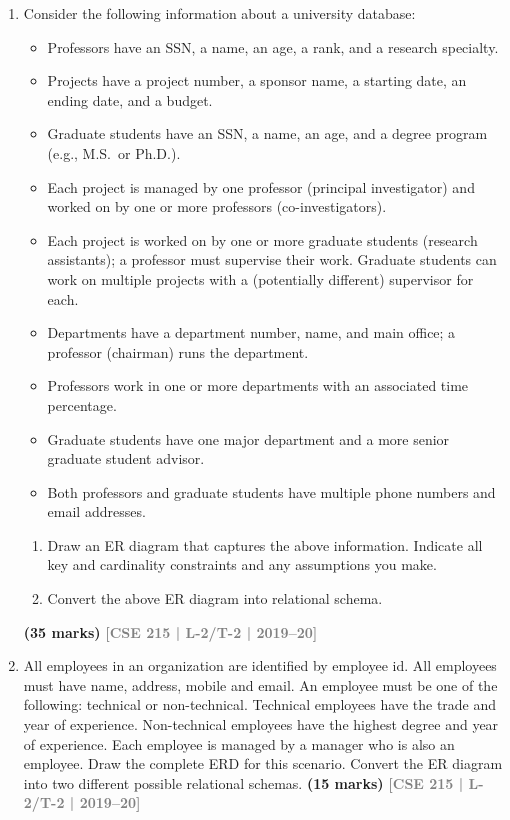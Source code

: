 \documentclass[12pt,a3paper]{article}
\newcommand{\yr}[1]{\hfill\textcolor{gray}{\small\textbf{[#1]}}}
\newcommand{\mk}[1]{\textcolor{orange!70!black}{\small\textbf{(#1 marks)}}}
\begin{document}
\begin{enumerate}
\begin{center}
\end{center}
\mk{10} \yr{CSE 215 | L-2/T-2 | 2018--19}

\item Consider the following information about a university database:
\begin{itemize}[leftmargin=1.5em,itemsep=1pt]
  \item Professors have an SSN, a name, an age, a rank, and a research specialty.
  \item Projects have a project number, a sponsor name, a starting date, an ending date, and a budget.
  \item Graduate students have an SSN, a name, an age, and a degree program (e.g., M.S.\ or Ph.D.).
  \item Each project is managed by one professor (principal investigator) and worked on by one or more professors (co-investigators).
  \item Each project is worked on by one or more graduate students (research assistants); a professor must supervise their work. Graduate students can work on multiple projects with a (potentially different) supervisor for each.
  \item Departments have a department number, name, and main office; a professor (chairman) runs the department.
  \item Professors work in one or more departments with an associated time percentage.
  \item Graduate students have one major department and a more senior graduate student advisor.
  \item Both professors and graduate students have multiple phone numbers and email addresses.
\end{itemize}
\begin{enumerate}
  \item Draw an ER diagram that captures the above information. Indicate all key and cardinality constraints and any assumptions you make.
  \item Convert the above ER diagram into relational schema.
\end{enumerate}
\mk{35} \yr{CSE 215 | L-2/T-2 | 2019--20}

\item All employees in an organization are identified by employee id. All employees must have name, address, mobile and email. An employee must be one of the following: technical or non-technical. Technical employees have the trade and year of experience. Non-technical employees have the highest degree and year of experience. Each employee is managed by a manager who is also an employee. Draw the complete ERD for this scenario. Convert the ER diagram into two different possible relational schemas.
\mk{15} \yr{CSE 215 | L-2/T-2 | 2019--20}


\end{enumerate}
\end{document}
